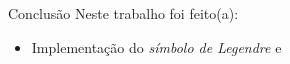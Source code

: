\begin{frame}{Conclusão}
    Neste trabalho foi feito(a):
    \begin{itemize}
        \item Implementação do \textit{símbolo de Legendre} e 
    \end{itemize}

\end{frame}